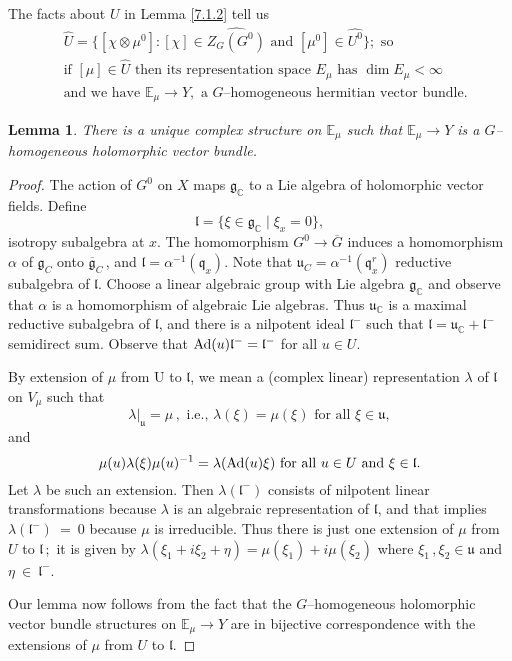 \documentclass{conm-p-l}
\newtheorem{lemma}[equation]{Lemma}
\renewcommand{\gg}{\mathfrak{g}}
\newcommand{\gq}{\mathfrak{q}}
\def\gg{\mathfrak{g}}
\def\gl{\mathfrak{l}}
\def\gq{\mathfrak{q}}
\def\gu{\mathfrak{u}}
\def\Ad{{\rm Ad}}
\def\C{\mathbb{C}}
\def\E{\mathbb{E}}
\begin{document}
The facts about $U$ in Lemma \ref{7.1.2} tell us 
\begin{equation}\label{7.1.3}
\begin{aligned}
&\widehat{U} = \{[\chi \otimes \mu^0] : [\chi] \in
	\widehat{Z_G(G^0)} \text{ and } [\mu^0] \in \widehat{U^0}\}; 
	\text{ so } \\
&\text{if } [\mu] \in \widehat{U} \text{ then its representation
	space } E_\mu \text{ has } \dim E_\mu < \infty \\
&\text{and we have } \E_\mu \to Y, \text{ a } G\text{--homogeneous hermitian 
	vector bundle.}
\end{aligned}
\end{equation}

\begin{lemma}\label{7.1.4} There is a unique complex
structure on $\E_\mu$ such that $\E_\mu \to Y$ is a $G$--homogeneous
holomorphic vector bundle.
\end{lemma}

\begin{proof}  The action of $G^0$ on $X$ maps $\gg_\C$ to a Lie
algebra of holomorphic vector fields.  Define
$$
\gl = \{\xi \in \gg_\C \mid \xi_x = 0\}, 
$$
isotropy subalgebra at $x$.  The homomorphism $G^0 \to \overline{G}$ induces
a homomorphism $\alpha$ of $\gg_C$ onto $\overline{\gg}_C$\,, and
$\gl = \alpha^{-1}(\gq_x)$.  Note that $\gu_C = \alpha^{-1}(\gq_x^r)$
reductive subalgebra of $\gl$.  Choose a linear algebraic group with Lie
algebra $\gg_\C$ and observe that $\alpha$ is a homomorphism of algebraic
Lie algebras.  Thus $\gu_\C$ is a maximal reductive subalgebra of $\gl$, 
and there is a nilpotent ideal $\gl^-$ such that $\gl =  \gu_\C + \gl^-$
semidirect sum.  Observe that $\Ad(u)\gl^- = \gl^-$ for all $u \in U$.

By extension of $\mu$ from U to $\gl$, we mean a (complex linear)
representation $\lambda$ of $\gl$ on $V_\mu$ such that
$$
\lambda|_\gu = \mu\,, \text{ i.e., } \lambda(\xi)
	= \mu(\xi) \text{ for all } \xi \in \gu,
$$
and 
$$
\mu(u)\lambda(\xi)\mu(u)^{-1} = \lambda(\Ad(u)\xi)
	\text{ for all } u \in U \text{ and } \xi \in \gl. 
$$
Let $\lambda$ be such an extension.  Then $\lambda(\gl^-)$ consists of
nilpotent linear transformations because $\lambda$ is an algebraic 
representation
of $\gl$, and that implies $\lambda(\gl^-)~=~0$ because $\mu$ is 
irreducible.  Thus there is just one extension of $\mu$ from $U$ to $\gl$\,;\,
it is given by $\lambda(\xi_1 + i \xi_2 + \eta) = \mu(\xi_1) + i\mu(\xi_2)$
where $\xi_1\,, \xi_2 \in \gu$ and~$\eta~\in~\gl^-$.

Our lemma now follows from the fact \cite[Theorem 3.6]{TW1970} that the
$G$--homogeneous holomorphic vector bundle structures on $\E_\mu \to Y$
are in bijective correspondence with the extensions of $\mu$ from $U$
to $\gl$. 
\end{proof}
\end{document}

